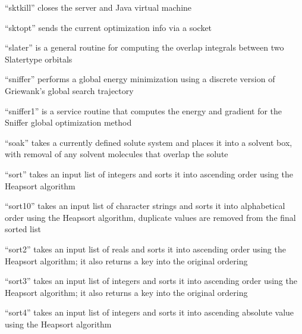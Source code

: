 \documentclass[letterpaper,11pt,english]{sphinxmanual}
\begin{document}

“sktkill” closes the server and Java virtual machine


“sktopt” sends the current optimization info via a socket


“slater” is a general routine for computing the overlap
integrals between two Slater\sphinxhyphen{}type orbitals


“sniffer” performs a global energy minimization using a
discrete version of Griewank’s global search trajectory


“sniffer1” is a service routine that computes the energy
and gradient for the Sniffer global optimization method


“soak” takes a currently defined solute system and places
it into a solvent box, with removal of any solvent molecules
that overlap the solute


“sort” takes an input list of integers and sorts it
into ascending order using the Heapsort algorithm


“sort10” takes an input list of character strings and sorts
it into alphabetical order using the Heapsort algorithm,
duplicate values are removed from the final sorted list


“sort2” takes an input list of reals and sorts it
into ascending order using the Heapsort algorithm;
it also returns a key into the original ordering


“sort3” takes an input list of integers and sorts it
into ascending order using the Heapsort algorithm;
it also returns a key into the original ordering


“sort4” takes an input list of integers and sorts it into
ascending absolute value using the Heapsort algorithm

\end{document}

